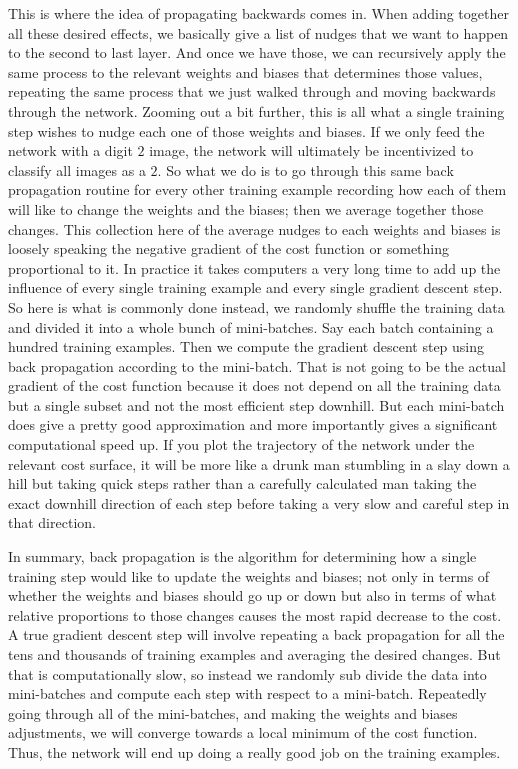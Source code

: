 \documentclass[master]{thesis-uestc}
\begin{document}
This is where the idea of propagating backwards comes in. When adding together all these desired effects, we basically give a list of nudges that we want to happen to the second to last layer. And once we have those, we can recursively apply the same process to the relevant weights and biases that determines those values, repeating the same process that we just walked through and moving backwards through the network. Zooming out a bit further, this is all what a single training step wishes to nudge each one of those weights and biases. If we only feed the network with a digit $2$ image, the network will ultimately be incentivized to classify all images as a $2$. So what we do is to go through this same back propagation routine for every other training example recording how each of them will like to change the weights and the biases; then we average together those changes. This collection here of the average nudges to each weights and biases is loosely speaking the negative gradient of the cost function or something proportional to it. In practice it takes computers a very long time to add up the influence of every single training example and every single gradient descent step. So here is what is commonly done instead, we randomly shuffle the training data and divided it into a whole bunch of mini-batches. Say each batch containing a hundred training examples. Then we compute the gradient descent step using back propagation according to the mini-batch. That is not going to be the actual gradient of the cost function because it does not depend on all the training data but a single subset and not the most efficient step downhill. But each mini-batch does give a pretty good approximation and more importantly gives a significant computational speed up. If you plot the trajectory of the network under the relevant cost surface, it will be more like a drunk man stumbling in a slay down a hill but taking quick steps rather than a carefully calculated man taking the exact downhill direction of each step before taking a very slow and careful step in that direction.

In summary, back propagation is the algorithm for determining how a single training step would like to update the weights and biases; not only in terms of whether the weights and biases should go up or down but also in terms of what relative proportions to those changes causes the most rapid decrease to the cost. A true gradient descent step will involve repeating a back propagation for all the tens and thousands of training examples and averaging the desired changes. But that is computationally slow, so instead we randomly sub divide the data into mini-batches and compute each step with respect to a mini-batch. Repeatedly going through all of the mini-batches, and making the weights and biases adjustments, we will converge towards a local minimum of the cost function. Thus, the network will end up doing a really good job on the training examples.
\end{document}
